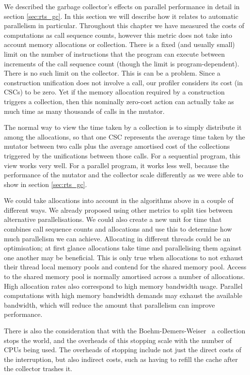 We described the garbage collector's effects on parallel performance in
detail in section \ref{sec:rts_gc}.
In this section we will describe how it relates to automatic parallelism in
particular.
Throughout this chapter we have measured the costs of computations as call
sequence counts,
however this metric does not take into account memory allocations or
collection.
There is a fixed (and usually small) limit
on the number of instructions that the program can execute
between increments of the call sequence count
(though the limit is program-dependent).
There is no such limit on the collector.
This is can be a problem.
Since a construction unification does not involve a call,
our profiler considers its cost (in CSCs) to be zero.
Yet if the memory allocation required by a construction
triggers a collection,
then this nominally zero-cost action can actually take as much time
as many thousands of calls in the mutator.

The normal way to view the time taken by a collection
is to simply distribute it among the allocations,
so that one CSC represents the average time taken
by the mutator between two calls
plus the average amortised cost of the collections
triggered by the unifications between those calls.
For a sequential program, this view works very well.
For a parallel program, it works less well,
because the performance of the mutator and the collector scale differently
as we were able to show in section \ref{sec:rts_gc}.

We could take allocations into account in the algorithms above in a couple
of different ways.
We already proposed using other metrics to split ties between alternative
parallelisations.
We could also create a new unit for time that combines call sequence counts
and allocations and use this to determine how much parallelism we can
achieve.
Allocating in different threads could be an optimisation;
at first glance allocations take time and parallelising them against one
another may be beneficial.
This is only true when allocations to not exhaust their thread local memory
pools and contend for the shared memory pool.
Access to the shared memory pool is normally amortised across a number of
allocations.
High allocation rates also correspond to high memory bandwidth usage.
Parallel computations with high memory bandwidth demands may exhaust the
available bandwidth,
which will reduce the amount that parallelism can improve performance.

There is also the consideration that with the
Boehm-Demers-Weiser~\citep{boehm:1988:gc}
a collection stops the world,
and the overheads of this stopping scale with the number of CPUs being used.
The overheads of stopping include
not just the direct costs of the interruption,
but also indirect costs,
such as having to refill the cache after the collector trashes it.

